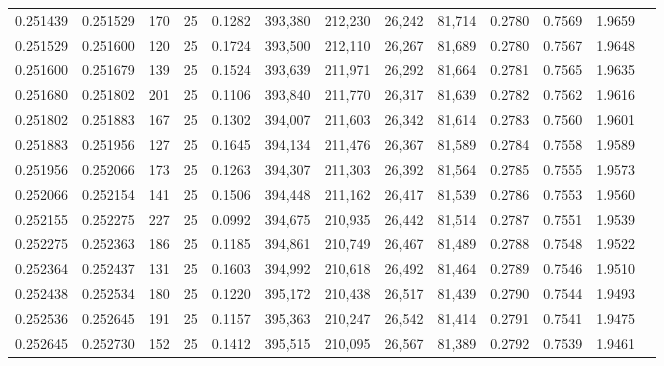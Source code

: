 \begin{tabular}{rrrrrrrrrrrrr}
0.251439 & 0.251529 &   170 &  25 &                                     0.1282 & 393,380 & 212,230 &  26,242 &  81,714 & 0.2780 & 0.7569 & 1.9659 \\
0.251529 & 0.251600 &   120 &  25 &                                     0.1724 & 393,500 & 212,110 &  26,267 &  81,689 & 0.2780 & 0.7567 & 1.9648 \\
0.251600 & 0.251679 &   139 &  25 &                                     0.1524 & 393,639 & 211,971 &  26,292 &  81,664 & 0.2781 & 0.7565 & 1.9635 \\
0.251680 & 0.251802 &   201 &  25 &                                     0.1106 & 393,840 & 211,770 &  26,317 &  81,639 & 0.2782 & 0.7562 & 1.9616 \\
0.251802 & 0.251883 &   167 &  25 &                                     0.1302 & 394,007 & 211,603 &  26,342 &  81,614 & 0.2783 & 0.7560 & 1.9601 \\
0.251883 & 0.251956 &   127 &  25 &                                     0.1645 & 394,134 & 211,476 &  26,367 &  81,589 & 0.2784 & 0.7558 & 1.9589 \\
0.251956 & 0.252066 &   173 &  25 &                                     0.1263 & 394,307 & 211,303 &  26,392 &  81,564 & 0.2785 & 0.7555 & 1.9573 \\
0.252066 & 0.252154 &   141 &  25 &                                     0.1506 & 394,448 & 211,162 &  26,417 &  81,539 & 0.2786 & 0.7553 & 1.9560 \\
0.252155 & 0.252275 &   227 &  25 &                                     0.0992 & 394,675 & 210,935 &  26,442 &  81,514 & 0.2787 & 0.7551 & 1.9539 \\
0.252275 & 0.252363 &   186 &  25 &                                     0.1185 & 394,861 & 210,749 &  26,467 &  81,489 & 0.2788 & 0.7548 & 1.9522 \\
0.252364 & 0.252437 &   131 &  25 &                                     0.1603 & 394,992 & 210,618 &  26,492 &  81,464 & 0.2789 & 0.7546 & 1.9510 \\
0.252438 & 0.252534 &   180 &  25 &                                     0.1220 & 395,172 & 210,438 &  26,517 &  81,439 & 0.2790 & 0.7544 & 1.9493 \\
0.252536 & 0.252645 &   191 &  25 &                                     0.1157 & 395,363 & 210,247 &  26,542 &  81,414 & 0.2791 & 0.7541 & 1.9475 \\
0.252645 & 0.252730 &   152 &  25 &                                     0.1412 & 395,515 & 210,095 &  26,567 &  81,389 & 0.2792 & 0.7539 & 1.9461 \\

\end{tabular}
